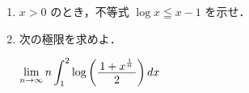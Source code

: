 ﻿\documentclass[../../../uem_mat_tok_q.tex]{subfiles}
\begin{document}
    \begin{enumerate}
        \item $x>0$ のとき，不等式 $\log x\leqq x-1$ を示せ．
        \item 次の極限を求めよ．

            \myspaceb%
            $\displaystyle%
                \lim_{n\to\infty}n\int_1^2\log\left(%
                \myfraca{1+x^{\frac{1}{\raisebox{1pt}{$\scriptscriptstyle n$}}}}{2}\right)dx%
            $
    \end{enumerate}
\end{document}

